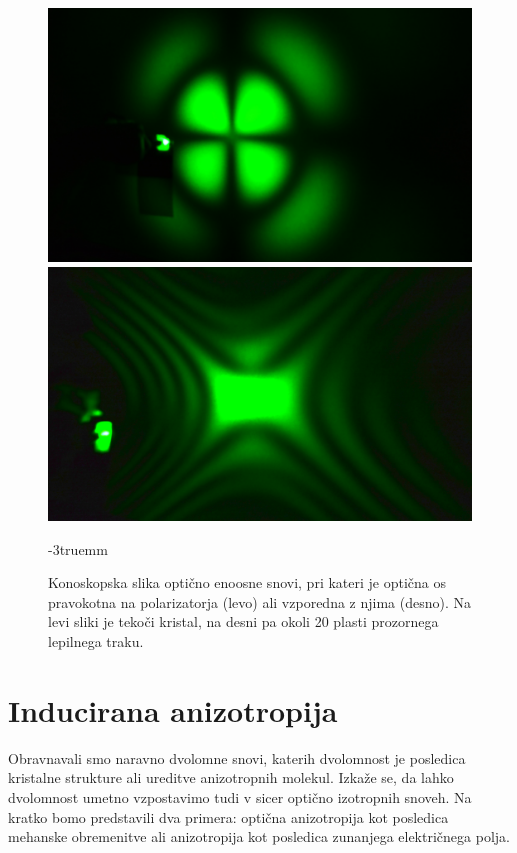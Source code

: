 \begin{figure}[ht]
\centering
\includegraphics[width=7truecm]{slike/10_Konoskopija3.jpg}\hfill
\includegraphics[width=7truecm]{slike/10_Konoskopija4.jpg}
\caption{Konoskopska slika optično enoosne snovi, pri kateri je optična os
pravokotna na polarizatorja (levo) ali vzporedna z njima (desno). Na levi sliki je
tekoči kristal, na desni pa okoli 20 plasti prozornega lepilnega traku.}
\label{fig:10_konoskopija2}
\vglue-3truemm
\end{figure}

\section{Inducirana anizotropija}
Obravnavali smo naravno dvolomne snovi, katerih dvolomnost je posledica kristalne
strukture ali ureditve anizotropnih molekul. Izkaže se, da lahko dvolomnost umetno
vzpostavimo tudi v sicer optično izotropnih snoveh. Na kratko bomo predstavili dva primera:
optična anizotropija kot posledica mehanske obremenitve ali anizotropija kot posledica
zunanjega električnega polja. 

